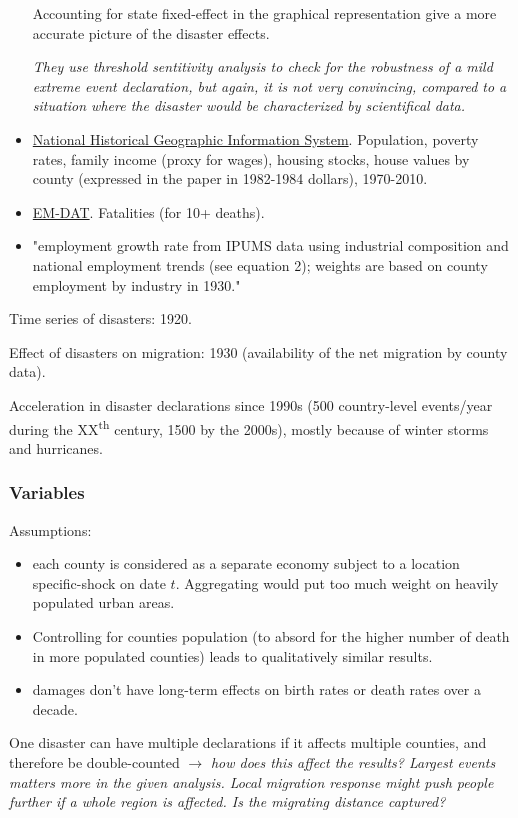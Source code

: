 \documentclass[11pt, oneside]{article}   	%
\begin{document}
\begin{itemize}
    Accounting for state fixed-effect in the graphical representation give a more accurate picture of the disaster effects. 

    \textit{They use threshold sentitivity analysis to check for the robustness of a mild extreme event declaration, but again, it is not very convincing, compared to a situation where the disaster would be characterized by scientifical data.}
    \item \href{https://www.nhgis.org/}{National Historical Geographic Information System}. Population, poverty rates, family income (proxy for wages), housing stocks, house values by county (expressed in the paper in 1982-1984 dollars), 1970-2010.
    \item \href{https://www.emdat.be/}{EM-DAT}. Fatalities (for 10+ deaths).
    \item "employment growth rate from IPUMS data using industrial composition and national employment trends (see equation 2); weights are based on county employment by industry in 1930."
\end{itemize}

Time series of disasters: 1920. 

Effect of disasters on migration: 1930 (availability of the net migration by county data).

Acceleration in disaster declarations since 1990s (500 country-level events/year during the XX\textsuperscript{th} century, 1500 by the 2000s), mostly because of winter storms and hurricanes.

\subsubsection{Variables}
Assumptions: 
\begin{itemize}
    \item each county is considered as a separate economy subject to a location specific-shock on date $t$. Aggregating would put too much weight on heavily populated urban areas.
    \item Controlling for counties population (to absord for the higher number of death in more populated counties) leads to qualitatively similar results.
    \item damages don't have long-term effects on birth rates or death rates over a decade. 
\end{itemize}

One disaster can have multiple declarations if it affects multiple counties, and therefore be double-counted $\to$ \textit{how does this affect the results? Largest events matters more in the given analysis. Local migration response might push people further if a whole region is affected. Is the migrating distance captured?}
\end{document}
